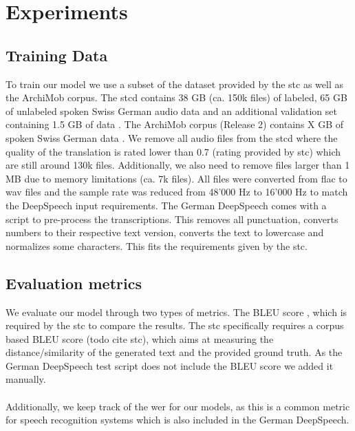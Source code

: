 \section{Experiments}

\subsection{Training Data}
To train our model we use a subset of the dataset provided by the \gls{stc} as well as the ArchiMob corpus. The \gls{stcd} contains 38 GB (ca. 150k files) of labeled, 65 GB of unlabeled spoken Swiss German audio data and an additional validation set
containing 1.5 GB of data \cite{stc2019}. The ArchiMob corpus (Release 2) contains X GB of spoken Swiss German data \cite{archimob2016}. We remove all audio files from the \gls{stcd} where the quality of the translation
is rated lower than 0.7 (rating provided by \gls{stc}) which are still around 130k files. Additionally, we also need to remove files larger than 1 MB due to memory limitations (ca. 7k files). All files were converted from flac to wav files and the sample rate was reduced from 48'000 Hz to 16'000 Hz to match the DeepSpeech input requirements.
The German DeepSpeech comes with a script to pre-process the transcriptions. This removes all punctuation, converts numbers to their respective text version, converts the text to lowercase and normalizes some characters. This fits the requirements given by the \gls{stc}.

\subsection{Evaluation metrics}
We evaluate our model through two types of metrics. The BLEU score \cite{Papineni2002BleuAM}, which is required by the \gls{stc} to compare the results. The \gls{stc} specifically requires a corpus
based BLEU score (todo cite stc), which aims at measuring the distance/similarity of the generated text and the provided ground truth. As the German DeepSpeech test script does not include the BLEU score we added it manually. \\~\\Additionally, we keep track of the \gls{wer} for our models, as
this is a common metric for speech recognition systems \cite{Park2008AnEA} which is also included in the German DeepSpeech.


